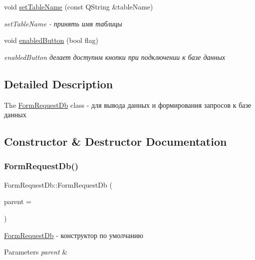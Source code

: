 \begin{DoxyCompactItemize}
void \hyperlink{classFormRequestDb_ac5fe463263f876ef7e6531b99d6f224d}{set\+Table\+Name} (const Q\+String \&table\+Name)
\begin{DoxyCompactList}\small\item\em set\+Table\+Name -\/ принять имя таблицы \end{DoxyCompactList}\item 
void \hyperlink{classFormRequestDb_ae86ba771347db116c4dc0d92b6dea2a8}{enabled\+Button} (bool flag)
\begin{DoxyCompactList}\small\item\em enabled\+Button делает доступнм кнопки при подключении к базе данных \end{DoxyCompactList}\end{DoxyCompactItemize}


\subsection{Detailed Description}
The \hyperlink{classFormRequestDb}{Form\+Request\+Db} class -\/ для вывода данных и формирования запросов к базе данных 

\subsection{Constructor \& Destructor Documentation}
\mbox{\label{classFormRequestDb_a073afd7a2f960c039e3a30e823123939}} 
\subsubsection{\texorpdfstring{Form\+Request\+Db()}{FormRequestDb()}}
{\footnotesize\ttfamily Form\+Request\+Db\+::\+Form\+Request\+Db (\begin{DoxyParamCaption}\item[{Q\+Widget $\ast$}]{parent = {} }\end{DoxyParamCaption})\hspace{0.3cm}{\ttfamily [explicit]}}



\hyperlink{classFormRequestDb}{Form\+Request\+Db} -\/ конструктор по умолчанию 


\begin{DoxyParams}{Parameters}
{\em parent} & \\
\hline
\end{DoxyParams}


